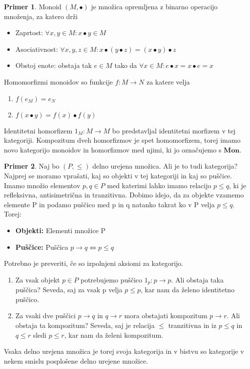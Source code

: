 \documentclass[12pt,a4paper]{book}
\theoremstyle{definition}
\theoremstyle{plain}
\theoremstyle{definition}
\newtheorem{primer}{Primer}[section]
\theoremstyle{remark}
\newcommand{\cat}[1]{\textbf{#1}}
\begin{document}
\begin{primer}
Monoid $(M, \bullet)$ je množica opremljena z binarno operacijo množenja, za katero drži
\begin{itemize}
\item Zaprtost: $\forall x,y \in M : x \bullet y \in M$
\item Asociativnost: $\forall x,y,z \in M : x \bullet ( y \bullet z ) = ( x \bullet y ) \bullet z$
\item Obstoj enote: obstaja tak $e \in M$ tako da $\forall x \in M : e \bullet x = x \bullet e = x$
\end{itemize}
Homomorfizmi monoidov so funkcije $f : M \to N$ za katere velja
\begin{enumerate}
\item $f(e_M) = e_N$
\item $f(x \bullet y) = f(x) \bullet f(y)$
\end{enumerate}
Identitetni homorfizem $1_M : M \to M$ bo predstavljal identitetni morfizem v tej kategoriji. Kompozitum dveh homorfizmov je spet homomorfizem, torej imamo novo kategorijo monoidov in homorfizmov med njimi, ki jo označujemo s $\cat{Mon}$.


\end{primer}

\begin{primer}
Naj bo $(P, \leq)$ delno urejena množica. Ali je to tudi kategorija? Najprej se moramo vprašati, kaj so objekti v tej kategoriji in kaj so puščice.
Imamo množio elementov $p,q \in P$ med katerimi lahko imamo relacijo $p \leq q$, ki je refleksivna, antisimetrična in tranzitivna. Dobimo idejo, da za objekte vzamemo elemente P in podamo puščico med p in q natanko takrat ko v P velja $p \leq q$.
Torej: 
\begin{itemize}
\item \textbf{Objekti:} Elementi množice P
\item \textbf{Puščice:} Puščica $p \rightarrow q \Leftrightarrow p \leq q$
\end{itemize}
Potrebno je preveriti, če so izpolnjeni aksiomi za kategorijo.

\begin{enumerate}[label=(\alph*)]
\item Za vsak objekt $p \in P$ potrebujemo puščico $1_p : p \to p$. Ali obstaja taka puščica? Seveda, saj za vsak p velja $p \leq p$, kar nam da želeno identitetno puščico.
\item Za vsaki dve puščici $p \to q$ in $q \to r$ mora obstajati kompozitum $p \to r$. Ali obstaja ta kompozitum? Seveda, saj je relacija $\leq$ tranzitivna in iz $p \leq q$ in $q \leq r$ sledi $p \leq r$, kar nam da želeni kompozitum.
\end{enumerate}
Vsaka delno urejena množica je torej svoja kategorija in v bistvu so kategorije v nekem smislu posplošene delno urejene množice.
\end{primer}
\end{document}

